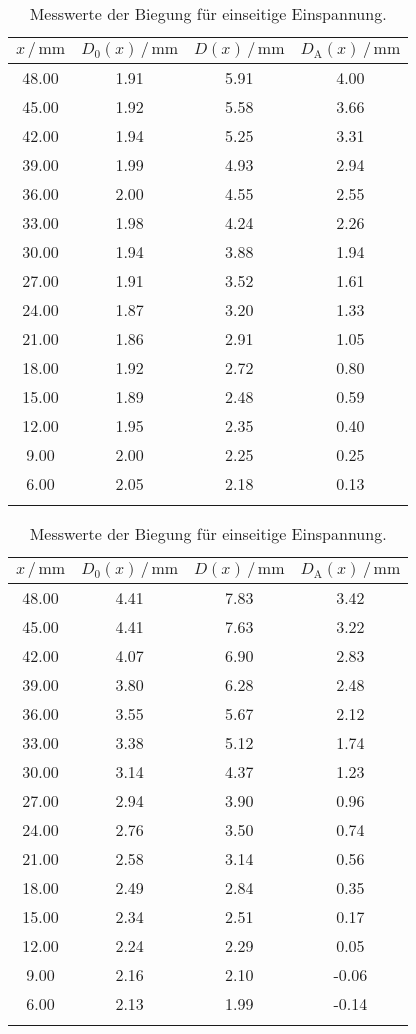 \begin{table}
\centering
\caption{Messwerte der Biegung für einseitige Einspannung.}
\begin{tabular}[t]{cccc}
    \toprule
    $x\,/\,\si{\milli\meter}$ & $D_0(x) \,/\, \si{\milli\meter}$ & $D(x) \,/\, \si{\milli\meter}$ & $D_\text{A}(x) \,/\, \si{\milli\meter}$\\
    \midrule
    48.00 & 1.91 & 5.91 & 4.00 \\
    45.00 & 1.92 & 5.58 & 3.66 \\
    42.00 & 1.94 & 5.25 & 3.31 \\
    39.00 & 1.99 & 4.93 & 2.94 \\
    36.00 & 2.00 & 4.55 & 2.55 \\
    33.00 & 1.98 & 4.24 & 2.26 \\
    30.00 & 1.94 & 3.88 & 1.94 \\
    27.00 & 1.91 & 3.52 & 1.61 \\
    24.00 & 1.87 & 3.20 & 1.33 \\
    21.00 & 1.86 & 2.91 & 1.05 \\
    18.00 & 1.92 & 2.72 & 0.80 \\
    15.00 & 1.89 & 2.48 & 0.59 \\
    12.00 & 1.95 & 2.35 & 0.40 \\
    9.00 & 2.00 & 2.25 & 0.25 \\
    6.00 & 2.05 & 2.18 & 0.13 \\
    \bottomrule
    
    \label{tab:ein_eckig}
\end{tabular}
\begin{tabular}[t]{cccc}
    \toprule
    $x\,/\,\si{\milli\meter}$ & $D_0(x) \,/\, \si{\milli\meter}$ & $D(x) \,/\, \si{\milli\meter}$ & $D_\text{A}(x) \,/\, \si{\milli\meter}$\\
    \midrule
    48.00 & 4.41 & 7.83 & 3.42 \\
    45.00 & 4.41 & 7.63 & 3.22 \\
    42.00 & 4.07 & 6.90 & 2.83 \\
    39.00 & 3.80 & 6.28 & 2.48 \\
    36.00 & 3.55 & 5.67 & 2.12 \\
    33.00 & 3.38 & 5.12 & 1.74 \\
    30.00 & 3.14 & 4.37 & 1.23 \\
    27.00 & 2.94 & 3.90 & 0.96 \\
    24.00 & 2.76 & 3.50 & 0.74 \\
    21.00 & 2.58 & 3.14 & 0.56 \\
    18.00 & 2.49 & 2.84 & 0.35 \\
    15.00 & 2.34 & 2.51 & 0.17 \\
    12.00 & 2.24 & 2.29 & 0.05 \\
    9.00 & 2.16 & 2.10 & -0.06 \\
    6.00 & 2.13 & 1.99 & -0.14 \\
    \bottomrule
    
    \label{tab:ein_rund}
\end{tabular}
\label{tab:einseitig}
\end{table}

